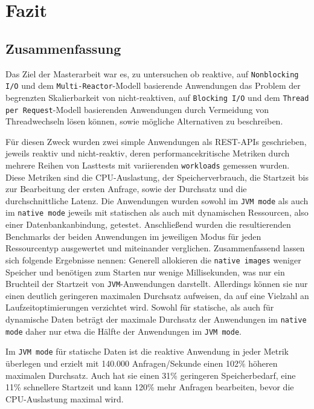 \section{Fazit}
\label{sec:fazit}
\subsection{Zusammenfassung}
\label{subsec:zusammenfassung}
Das Ziel der Masterarbeit war es, zu untersuchen ob reaktive, auf \verb|Nonblocking I/O| und dem \verb|Multi-Reactor|-Modell basierende
Anwendungen das Problem der begrenzten Skalierbarkeit von nicht-reaktiven, auf \verb|Blocking I/O| und dem \verb|Thread per Request|-Modell
basierenden Anwendungen durch Vermeidung von Threadwechseln lösen können, sowie mögliche Alternativen zu beschreiben.

Für diesen Zweck wurden zwei simple Anwendungen als REST-APIs geschrieben, jeweils reaktiv und nicht-reaktiv, deren
performancekritische Metriken durch mehrere Reihen von Lasttests mit variierenden \verb|workloads| gemessen wurden.
Diese Metriken sind die CPU-Auslastung, der Speicherverbrauch, die Startzeit bis zur Bearbeitung der ersten Anfrage,
sowie der Durchsatz und die durchschnittliche Latenz.
Die Anwendungen wurden sowohl im \verb|JVM mode| als auch im \verb|native mode| jeweils mit statischen als auch mit dynamischen
Ressourcen, also einer Datenbankanbindung, getestet.
Anschließend wurden die resultierenden Benchmarks der beiden Anwendungen im jeweiligen Modus für jeden Ressourcentyp ausgewertet und
miteinander verglichen.\newline
Zusammenfassend lassen sich folgende Ergebnisse nennen:\newline
Generell allokieren die \verb|native images| weniger Speicher und benötigen zum Starten nur wenige Millisekunden, was nur ein Bruchteil der Startzeit
von \verb|JVM|-Anwendungen darstellt. Allerdings können sie nur einen deutlich
geringeren maximalen Durchsatz aufweisen, da auf eine Vielzahl an Laufzeitoptimierungen verzichtet wird.
Sowohl für statische, als auch für dynamische Daten beträgt der maximale Durchsatz der Anwendungen im \verb|native mode|
daher nur etwa die Hälfte der Anwendungen im \verb|JVM mode|.

Im \verb|JVM mode| für statische Daten ist die reaktive Anwendung in jeder Metrik überlegen und erzielt mit 140.000 Anfragen/Sekunde
einen 102\% höheren maximalen Durchsatz.
Auch hat sie einen 31\% geringeren Speicherbedarf, eine 11\% schnellere Startzeit und kann 120\% mehr Anfragen bearbeiten,
bevor die CPU-Auslastung maximal wird.

